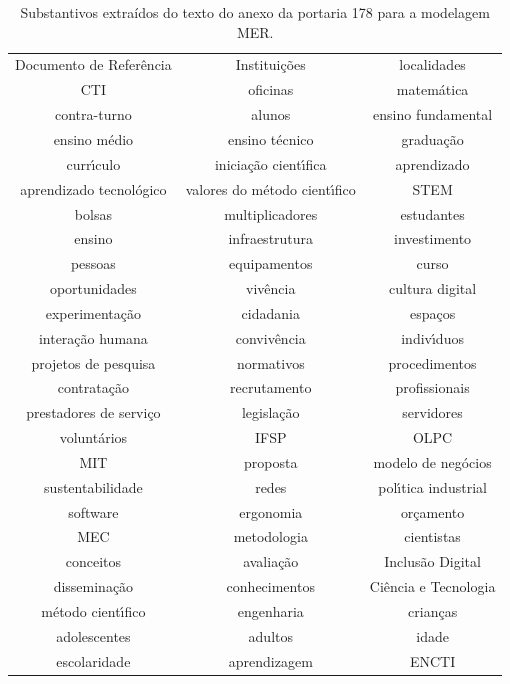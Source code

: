 \documentclass[
12pt,		%
openright,	%
twoside,  %
a4paper,			%
chapter=TITLE,		%
english,			%
french,				%
spanish,			%
brazil				%
]{USPSC-classe/USPSC}
\begin{document}
\begin{table}[htb]
\tiny
\caption{\label{ed98281d009c18519ead0b6dc7fab5fc772f0825}Substantivos extra\'{i}dos do texto do anexo da portaria 178 para a modelagem MER.}

\centering
\begin{tabular}{|c|c|c|}
\hline
Documento de Refer\^encia  &  Institui\c{c}\~oes  &  localidades \\
CTI  &  oficinas  &  matem\'atica  \\
contra-turno  &  alunos  &  ensino fundamental \\
ensino m\'edio  &  ensino t\'ecnico  &  gradua\c{c}\~ao \\
curr\'{\i}culo  &  inicia\c{c}\~ao cient\'{\i}fica  &  aprendizado \\
aprendizado tecnol\'ogico  &  valores do m\'etodo cient\'{\i}fico  &  STEM \\
bolsas  &  multiplicadores  &  estudantes \\
ensino  &  infraestrutura  &  investimento \\
pessoas  &  equipamentos  &  curso \\
oportunidades  &  viv\^encia  &  cultura digital \\
experimenta\c{c}\~ao  &  cidadania  &  espa\c{c}os \\
intera\c{c}\~ao humana  &  conviv\^encia  &  indiv\'{\i}duos  \\
projetos de pesquisa  &  normativos  &  procedimentos \\
contrata\c{c}\~ao  &  recrutamento  &  profissionais \\
prestadores de servi\c{c}o  &  legisla\c{c}\~ao  &  servidores \\
volunt\'arios  &  IFSP  &  OLPC \\
MIT  &  proposta  &  modelo de neg\'ocios \\
sustentabilidade  &  redes  &  pol\'{\i}tica industrial \\
software  &  ergonomia  &  or\c{c}amento \\
MEC  &  metodologia  &  cientistas  \\
conceitos  &  avalia\c{c}\~ao  &  Inclus\~ao Digital \\
dissemina\c{c}\~ao  &  conhecimentos  &  Ci\^encia e Tecnologia \\
m\'etodo cient\'{\i}fico  &  engenharia  &  crian\c{c}as \\
adolescentes  &  adultos  &  idade \\
escolaridade  &  aprendizagem  &  ENCTI \\

\end{tabular}
\end{table}
\end{document}

